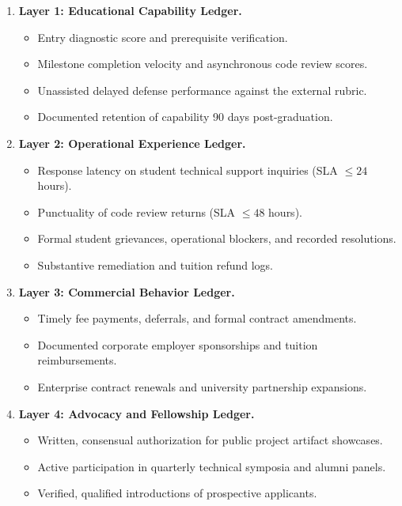 \begin{enumerate}[leftmargin=*]
\item \textbf{Layer 1: Educational Capability Ledger.}
\begin{itemize}[leftmargin=*]
\item Entry diagnostic score and prerequisite verification.
\item Milestone completion velocity and asynchronous code review scores.
\item Unassisted delayed defense performance against the external rubric.
\item Documented retention of capability 90 days post-graduation.
\end{itemize}
\item \textbf{Layer 2: Operational Experience Ledger.}
\begin{itemize}[leftmargin=*]
\item Response latency on student technical support inquiries (SLA $\le 24$ hours).
\item Punctuality of code review returns (SLA $\le 48$ hours).
\item Formal student grievances, operational blockers, and recorded resolutions.
\item Substantive remediation and tuition refund logs.
\end{itemize}
\item \textbf{Layer 3: Commercial Behavior Ledger.}
\begin{itemize}[leftmargin=*]
\item Timely fee payments, deferrals, and formal contract amendments.
\item Documented corporate employer sponsorships and tuition reimbursements.
\item Enterprise contract renewals and university partnership expansions.
\end{itemize}
\item \textbf{Layer 4: Advocacy and Fellowship Ledger.}
\begin{itemize}[leftmargin=*]
\item Written, consensual authorization for public project artifact showcases.
\item Active participation in quarterly technical symposia and alumni panels.
\item Verified, qualified introductions of prospective applicants.
\end{itemize}
\end{enumerate}


